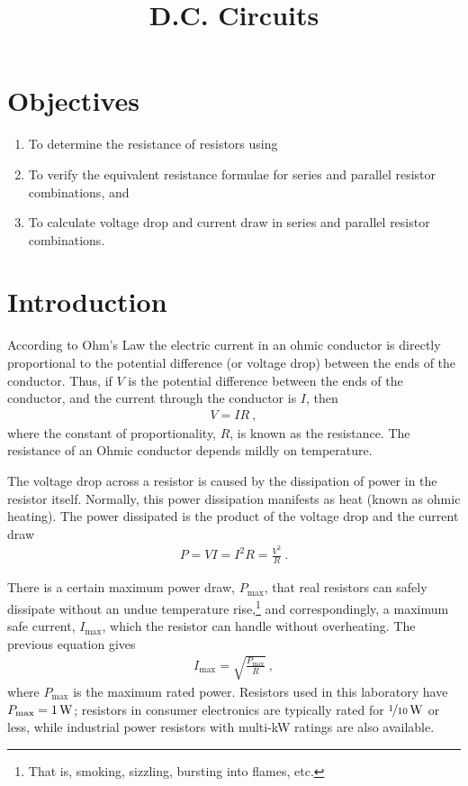 \documentclass[12pt]{article}
\title{D.C. Circuits}
\author{}
\date{}
\begin{document}
\maketitle

\section{Objectives}
\label{sec:objectives}

\begin{enumerate}
\item To determine the resistance of resistors using
\item To verify the equivalent resistance formulae for series and
  parallel resistor combinations, and
\item To calculate voltage drop and current draw in series and
  parallel resistor combinations.
\end{enumerate}

\section{Introduction}
\label{sec:introduction}

According to Ohm's Law the electric current in an ohmic conductor is
directly proportional to the potential difference (or voltage drop)
between the ends of the conductor.  Thus, if $V$ is the potential
difference between the ends of the conductor, and the current through
the conductor is $I$, then
\begin{gather*}
  V = IR\ ,
\end{gather*}
where the constant of proportionality, $R$, is known as the
resistance.  The resistance of an Ohmic conductor depends mildly on
temperature.

The voltage drop across a resistor is caused by the dissipation of
power in the resistor itself.  Normally, this power dissipation
manifests as heat (known as ohmic heating).  The power dissipated is
the product of the voltage drop and the current draw
\begin{gather*}
  P = VI = I^2 R = \frac{V^2}{R}\ .
\end{gather*}

There is a certain maximum power draw, $P_\mathrm{max}$, that real
resistors can safely dissipate without an undue temperature
rise,\footnote{That is, smoking, sizzling, bursting into flames, etc.}
and correspondingly, a maximum safe current, $I_\mathrm{max}$, which
the resistor can handle without overheating.  The previous equation
gives
\begin{gather*}
  I_\mathrm{max} = \sqrt{\frac{P_\mathrm{max}}{R}}\ ,
\end{gather*}
where $P_\mathrm{max}$ is the maximum rated power.  Resistors used in
this laboratory have $P_\mathrm{max} = \unit[1]{W}$; resistors in
consumer electronics are typically rated for
$\unit[\nicefrac{1}{10}]{W}$ or less, while industrial power resistors
with multi-\unit{kW} ratings are also available.
\end{document}
